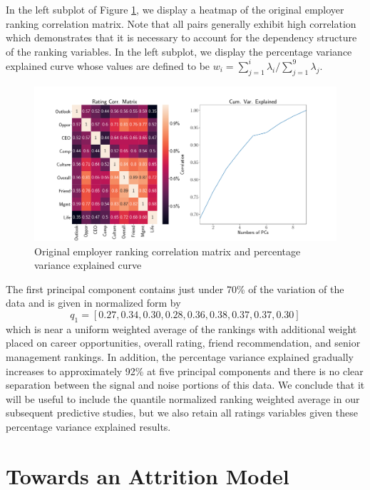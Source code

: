 \documentclass[10pt]{article}
\begin{document}
In the left subplot of Figure \ref{fig:pcagr}, we display a heatmap of the 
original employer ranking correlation matrix.  Note that all pairs 
generally exhibit high correlation which demonstrates 
that it is necessary to account for the dependency structure of the ranking 
variables.  In the left subplot, we display the percentage variance explained curve 
whose values are defined to be $w_i = \sum_{j=1}^i\lambda_i/\sum_{j=1}^9\lambda_j$. 
%
\begin{figure}[thb]
    \centering
	\includegraphics[width=1.0\linewidth]{pcagr.pdf}
	\caption{Original employer ranking correlation matrix and percentage variance 
    explained curve}
	\label{fig:pcagr}
\end{figure}
%
The first principal component contains just under 70\% of the variation of the data 
and is given in normalized form by  
%
\begin{equation}
    q_1 = [0.27,0.34,0.30,0.28,0.36,0.38,0.37,0.37,0.30] 
\end{equation}
%
which is near a uniform weighted average of the rankings with additional 
weight placed on career opportunities, overall rating, friend recommendation, and 
senior management rankings. In addition, the percentage variance explained 
gradually increases to approximately 92\% at five principal components and 
there is no clear separation between the signal and noise portions of this data.
We conclude that it will be useful to include the quantile normalized 
ranking weighted average in our subsequent predictive studies, but we 
also retain all ratings variables given these percentage variance explained results. 

\section{Towards an Attrition Model}\label{modsec}
\end{document}
